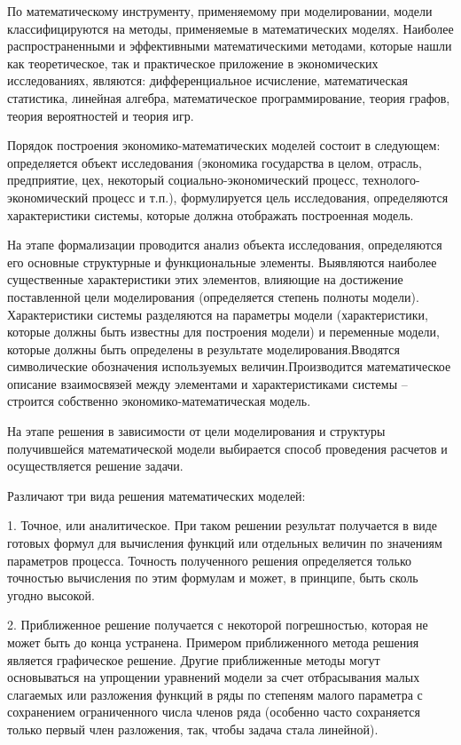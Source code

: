 По математическому инструменту, применяемому при моделировании, модели классифицируются на методы, применяемые в математических моделях. Наиболее распространенными и эффективными математическими методами, которые нашли как теоретическое, так и практическое приложение в экономических исследованиях, являются: дифференциальное исчисление, математическая статистика, линейная алгебра, математическое программирование, теория графов, теория вероятностей и теория игр.


Порядок построения экономико-математических моделей состоит в следующем: определяется объект исследования (экономика государства в целом, отрасль, предприятие, цех, некоторый социально-экономический процесс, технолого-экономический процесс и т.п.), формулируется цель исследования, определяются характеристики системы, которые должна отображать построенная модель.


 На этапе формализации проводится анализ объекта исследования, определяются его основные структурные и функциональные элементы. Выявляются наиболее существенные характеристики этих элементов, влияющие на достижение поставленной цели моделирования (определяется степень полноты модели). Характеристики системы разделяются на параметры модели (характеристики, которые должны быть известны для построения модели) и переменные модели, которые должны быть определены в результате моделирования.Вводятся символические обозначения используемых величин.Производится математическое описание взаимосвязей между элементами и характеристиками системы – строится собственно экономико-математическая модель.
 
 
На этапе решения в зависимости от цели моделирования и структуры получившейся математической модели выбирается способ проведения расчетов и осуществляется решение задачи.


Различают три вида решения математических моделей:


1. Точное, или аналитическое. При таком решении результат получается в виде готовых формул для вычисления функций или отдельных величин по значениям параметров процесса. Точность полученного решения определяется только точностью вычисления по этим формулам и может, в принципе, быть сколь угодно высокой.


2. Приближенное решение получается с некоторой погрешностью, которая не может быть до конца устранена. Примером приближенного метода решения является графическое решение. Другие приближенные методы могут основываться на упрощении уравнений модели за счет отбрасывания малых слагаемых или разложения функций в ряды по степеням малого параметра с сохранением ограниченного числа членов ряда (особенно часто сохраняется только первый член разложения, так, чтобы задача стала линейной).


